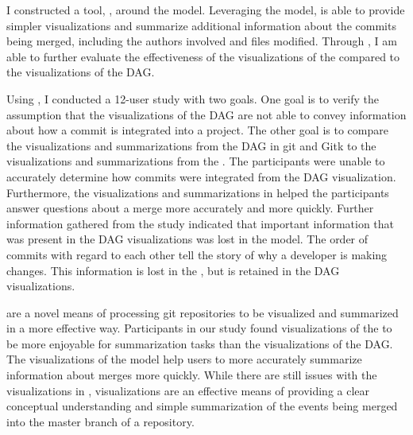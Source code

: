 I constructed a tool, \tool{}, around the \mt{} model. Leveraging the
model, \tool{} is able to provide simpler visualizations and summarize
additional information about the commits being merged, including the
authors involved and files modified. Through \tool{}, I am able to
further evaluate the effectiveness of the visualizations of the \mt{}
compared to the visualizations of the DAG\@.

Using \tool{}, I conducted a 12-user study with two goals. One goal is
to verify the assumption that the visualizations of the DAG are not able
to convey information about how a commit is integrated into a project.
The other goal is to compare the visualizations and summarizations from
the DAG in git and Gitk to the visualizations and summarizations from
the \mt{}. The participants were unable to accurately determine how
commits were integrated from the DAG visualization. Furthermore, the
visualizations and summarizations in \tool{} helped the participants
answer questions about a merge more accurately and more quickly. Further
information gathered from the study indicated that important information
that was present in the DAG visualizations was lost in the \mt{} model.
The order of commits with regard to each other tell the story of why a
developer is making changes. This information is lost in the \mt{}, but
is retained in the DAG visualizations.

 are a novel means of processing git repositories to be visualized
and summarized in a more effective way. Participants in our study found
visualizations of the \mt{} to be more enjoyable for summarization tasks
than the visualizations of the DAG. The visualizations of the \mt{}
model help users to more accurately summarize information about merges
more quickly. While there are still issues with the visualizations in
\tool{}, \mt{} visualizations are an effective means of providing a
clear conceptual understanding and simple summarization of the events
being merged into the master branch of a repository.
